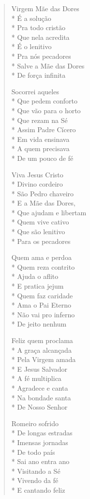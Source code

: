 \begin{verse}
Virgem Mãe das Dores\\*
É a solução\\*
Pra todo cristão\\*
Que nela acredita\\*
É o lenitivo\\*
Pra nós pecadores\\*
Salve a Mãe das Dores\\*
De força infinita

Socorrei aqueles\\*
Que pedem conforto\\*
Que vão para o horto\\*
Que rezam na Sé\\*
Assim Padre Cícero\\*
Em vida ensinava\\*
A quem precisava\\*
De um pouco de fé

Viva Jesus Cristo\\*
Divino cordeiro\\*
São Pedro chaveiro\\*
E a Mãe das Dores,\\*
Que ajudam e libertam\\*
Quem vive cativo\\*
Que são lenitivo\\*
Para os pecadores

Quem ama e perdoa\\*
Quem reza contrito\\*
Ajuda o aflito\\*
E pratica jejum\\*
Quem faz caridade\\*
Ama o Pai Eterno\\*
Não vai pro inferno\\*
De jeito nenhum

Feliz quem proclama\\*
A graça alcançada\\*
Pela Virgem amada\\*
E Jesus Salvador\\*
A fé multiplica\\*
Agradece e canta\\*
Na bondade santa\\*
De Nosso Senhor

Romeiro sofrido\\*
De longas estradas\\*
Imensas jornadas\\*
De todo país\\*
Sai ano entra ano\\*
Visitando a Sé\\*
Vivendo da fé\\*
E cantando feliz


\end{verse}
